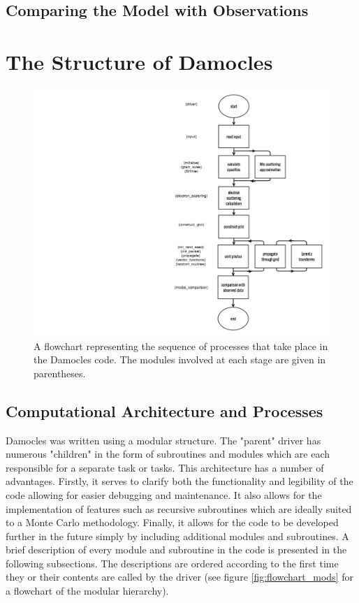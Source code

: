 \subsection{Comparing the Model with Observations}
	
\section{The Structure of Damocles}
\label{damocles_struct}
	
	\begin{centering}
	\begin{figure}
	\includegraphics[scale=0.8, trim=160mm 5mm 8mm 5mm]{chapters/chapter2/code_flow.png}
	\caption{A flowchart representing the sequence of processes that take place in the Damocles code.  The modules involved at each stage are given in parentheses.}
	\label{fig:flowchart}
	\end{figure}
	\end{centering}	
	
	
	\subsection{Computational Architecture and Processes}



	
	Damocles was written using a modular structure.  The "parent" driver has numerous "children" in the form of subroutines and modules which are each responsible for a separate task or tasks.  This architecture has a number of advantages.  Firstly, it serves to clarify both the functionality and legibility of the code allowing for easier debugging and maintenance.  It also allows for the implementation of features such as recursive subroutines which are ideally suited to a Monte Carlo methodology.  Finally, it allows for the code to be developed further in the future simply by including additional modules and subroutines.  A brief description of every module and subroutine in the code is presented in the following subsections.  The descriptions are ordered according to the first time they or their contents are called by the driver (see figure \ref{fig:flowchart_mods} for a flowchart of the modular hierarchy).
	

